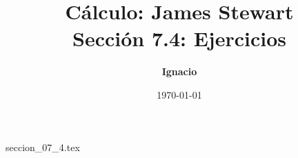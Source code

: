 \documentclass[11pt,spanish,oneside]{report}
\title{\textbf{Cálculo: James Stewart} \\ \Large Sección 7.4: Ejercicios}
\author{\textbf{Ignacio}}
\date{\today}
\begin{document}
\maketitle

{seccion_07_4.tex}
\end{document}
